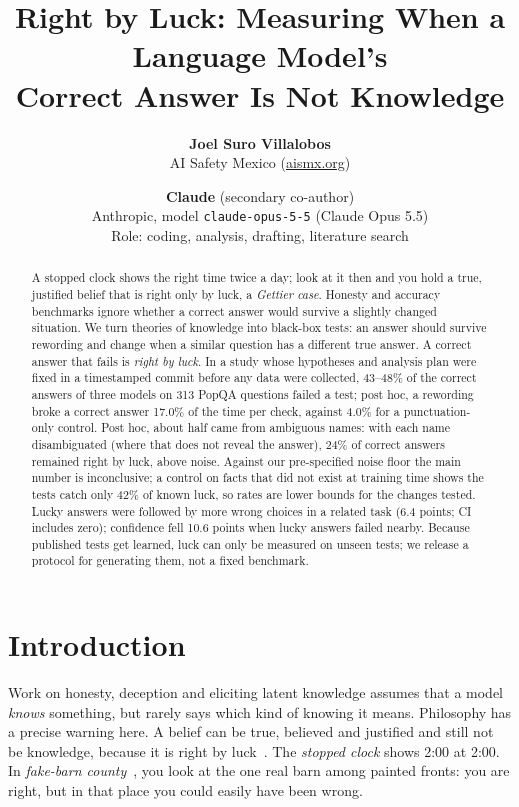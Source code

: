 \documentclass[10pt]{article}
\title{\vspace{-1.2em}\textbf{Right by Luck: Measuring When a Language Model's\\Correct Answer Is Not Knowledge}\vspace{-0.3em}}
\author{
\textbf{Joel Suro Villalobos}\\ AI Safety Mexico (\href{https://www.aismx.org/en/}{aismx.org})
\and
\textbf{Claude} (secondary co-author)\\ Anthropic, model \texttt{claude-opus-5-5} (Claude Opus 5.5)\\ {\small Role: coding, analysis, drafting, literature search}
}
\date{\vspace{-0.6em}{\small AI $\times$ Epistemics Research Sprint (Apart Research), November 2026 --- Track 1: Model Epistemics \& Decision-Making Evals}\vspace{-0.8em}}
\begin{document}
\maketitle

\begin{abstract}
\noindent A stopped clock shows the right time twice a day; look at it then and you hold a true, justified belief that is right only by luck, a \emph{Gettier case}. Honesty and accuracy benchmarks ignore whether a correct answer would survive a slightly changed situation. We turn theories of knowledge into black-box tests: an answer should survive rewording and change when a similar question has a different true answer. A correct answer that fails is \emph{right by luck}. In a study whose hypotheses and analysis plan were fixed in a timestamped commit before any data were collected, 43--48\% of the correct answers of three models on 313 PopQA questions failed a test; post hoc, a rewording broke a correct answer 17.0\% of the time per check, against 4.0\% for a punctuation-only control. Post hoc, about half came from ambiguous names: with each name disambiguated (where that does not reveal the answer), 24\% of correct answers remained right by luck, above noise. Against our pre-specified noise floor the main number is inconclusive; a control on facts that did not exist at training time shows the tests catch only 42\% of known luck, so rates are lower bounds for the changes tested. Lucky answers were followed by more wrong choices in a related task (6.4 points; CI includes zero); confidence fell 10.6 points when lucky answers failed nearby. Because published tests get learned, luck can only be measured on unseen tests; we release a protocol for generating them, not a fixed benchmark.
\end{abstract}

\section{Introduction}
Work on honesty, deception and eliciting latent knowledge assumes that a model \emph{knows} something, but rarely says which kind of knowing it means. Philosophy has a precise warning here. A belief can be true, believed and justified and still not be knowledge, because it is right by luck~\cite{gettier}. The \emph{stopped clock} shows 2:00 at 2:00. In \emph{fake-barn county}~\cite{goldman76}, you look at the one real barn among painted fronts: you are right, but in that place you could easily have been wrong.
\end{document}
